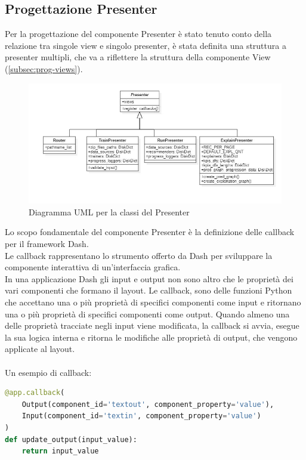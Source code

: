 \subsection{Progettazione Presenter}
\label{subsec:presenter}
Per la progettazione del componente Presenter è stato tenuto conto della relazione tra singole view e singolo presenter, è stata definita una struttura a presenter multipli, che va a riflettere la struttura della componente View (\autoref{subsec:prog-views}).


\begin{figure}[H] 
    \centering 
    \includegraphics[width=0.8\columnwidth]{immagini/uml-presenters.jpg} 
    \caption{Diagramma UML per la classi del Presenter}
    \label{fig:uml-presenters}
\end{figure}

Lo scopo fondamentale del componente Presenter è la definizione delle callback per il framework Dash.
\\
Le callback rappresentano lo strumento offerto da Dash per sviluppare la componente interattiva di un'interfaccia grafica. 
\\
In una applicazione Dash gli input e output non sono altro che le proprietà dei vari componenti che formano il layout.
Le callback, sono delle funzioni Python che accettano una o più proprietà di specifici componenti come input e ritornano una o più proprietà di specifici componenti come output. Quando almeno una delle proprietà tracciate negli input viene modificata, la callback si avvia, esegue la sua logica interna e ritorna le modifiche alle proprietà di output, che vengono applicate al layout. 
\\ \\
Un esempio di callback:

\begin{lstlisting}[language=Python]
	@app.callback(
    Output(component_id='textout', component_property='value'),
    Input(component_id='textin', component_property='value')
)
def update_output(input_value):
    return input_value
\end{lstlisting}

